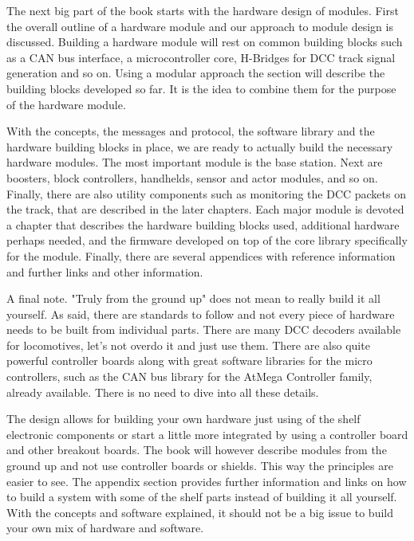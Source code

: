 The next big part of the book starts with the hardware design of modules. First the overall outline of a hardware module and our approach to module design is discussed. Building a hardware module will rest on common building blocks such as a CAN bus interface, a microcontroller core, H-Bridges for DCC track signal generation and so on. Using a modular approach the section will describe the building blocks developed so far. It is the idea to combine them for the purpose of the hardware module.

With the concepts, the messages and protocol, the software library and the hardware building blocks in place, we are ready to actually build the necessary hardware modules. The most important module is the base station. Next are boosters, block controllers, handhelds, sensor and actor modules, and so on. Finally, there are also utility components such as monitoring the DCC packets on the track, that are described in the later chapters. Each major module is devoted a chapter that describes the hardware building blocks used, additional hardware perhaps needed, and the firmware developed on top of the core library specifically for the module. Finally, there are several appendices with reference information and further links and other information.


A final note. "Truly from the ground up" does not mean to really build it all yourself. As said, there are standards to follow and not every piece of hardware needs to be built from individual parts. There are many DCC decoders available for locomotives, let's not overdo it and just use them. There are also quite powerful controller boards along with great software libraries for the micro controllers, such as the CAN bus library for the AtMega Controller family, already available. There is no need to dive into all these details.

The design allows for building your own hardware just using of the shelf electronic components or start a little more integrated by using a controller board and other breakout boards. The book will however describe modules from the ground up and not use controller boards or shields. This way the principles are easier to see. The appendix section provides further information and links on how to build a system with some of the shelf parts instead of building it all yourself. With the concepts and software explained, it should not be a big issue to build your own mix of hardware and software.

